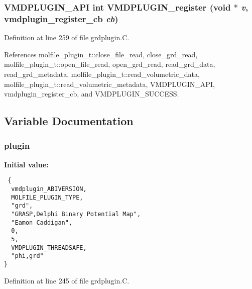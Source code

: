 \subsubsection{\setlength{\rightskip}{0pt plus 5cm}VMDPLUGIN\_\-API int VMDPLUGIN\_\-register (void $\ast$ {\em v}, {\bf vmdplugin\_\-register\_\-cb} {\em cb})}\label{grdplugin_8C_a7}




Definition at line 259 of file grdplugin.C.

References molfile\_\-plugin\_\-t::close\_\-file\_\-read, close\_\-grd\_\-read, molfile\_\-plugin\_\-t::open\_\-file\_\-read, open\_\-grd\_\-read, read\_\-grd\_\-data, read\_\-grd\_\-metadata, molfile\_\-plugin\_\-t::read\_\-volumetric\_\-data, molfile\_\-plugin\_\-t::read\_\-volumetric\_\-metadata, VMDPLUGIN\_\-API, vmdplugin\_\-register\_\-cb, and VMDPLUGIN\_\-SUCCESS.

\subsection{Variable Documentation}
\subsubsection{ plugin\hspace{0.3cm}{\tt  [static]}}\label{grdplugin_8C_a0}


{\bf Initial value:}

\footnotesize\begin{verbatim} {
  vmdplugin_ABIVERSION,                
  MOLFILE_PLUGIN_TYPE,                 
  "grd",                               
  "GRASP,Delphi Binary Potential Map", 
  "Eamon Caddigan",                    
  0,                                   
  5,                                   
  VMDPLUGIN_THREADSAFE,                
  "phi,grd"                            
}\end{verbatim}\normalsize 


Definition at line 245 of file grdplugin.C.